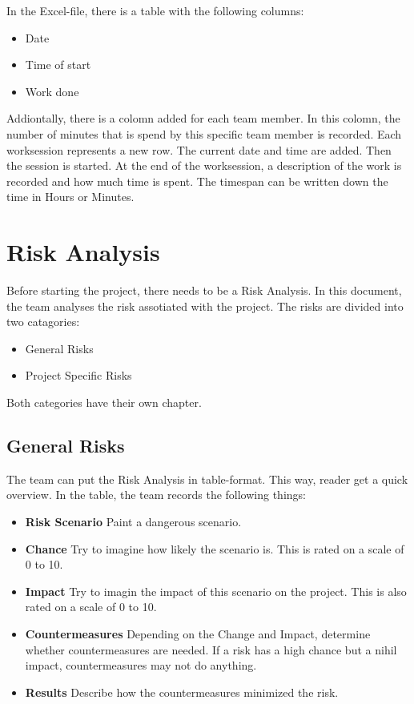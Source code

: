 \documentclass[10pt]{report}
\begin{document}
In the Excel-file, there is a table with the following columns:

\begin{itemize}
	\item Date
	\item Time of start
	\item Work done
\end{itemize}

Addiontally, there is a colomn added for each team member. In this colomn, the number of minutes that is spend by this specific team member is recorded. Each worksession represents a new row. The current date and time are added. Then the session is started. At the end of the worksession, a description of the work is recorded and how much time is spent. The timespan can be written down the time in Hours or Minutes.

\newpage

\section{Risk Analysis}

Before starting the project, there needs to be a Risk Analysis. In this document, the team analyses the risk assotiated with the project. The risks are divided into two catagories:

\begin{itemize}
	\item General Risks
	\item Project Specific Risks
\end{itemize}

Both categories have their own chapter.

\subsection{General Risks}

The team can put the Risk Analysis in table-format. This way, reader get a quick overview. In the table, the team records the following things:

\begin{itemize}
	\item \textbf{Risk Scenario} Paint a dangerous scenario.
	\item \textbf{Chance} Try to imagine how likely the scenario is. This is rated on a scale of 0 to 10.
	\item \textbf{Impact} Try to imagin the impact of this scenario on the project. This is also rated on a scale of 0 to 10.  
	\item \textbf{Countermeasures} Depending on the Change and Impact, determine whether countermeasures are needed. If a risk has a high chance but a nihil impact, countermeasures may not do anything.
	\item \textbf{Results} Describe how the countermeasures minimized the risk.  
\end{itemize}
\end{document}
